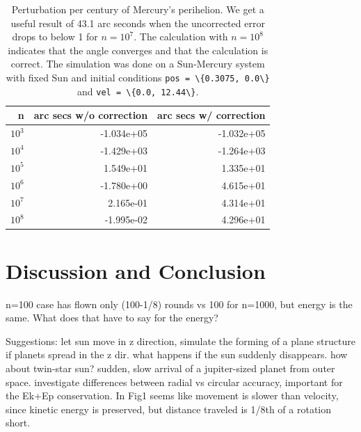 \documentclass[]{article}
\begin{document}
\begin{table}[!ht]
	\caption{Perturbation per century of Mercury's perihelion. We get a useful result of 43.1 arc seconds when the uncorrected error drops to below 1 for $n=10^7$. The calculation with $n=10^8$ indicates that the angle converges and that the calculation is correct. The simulation was done on a Sun-Mercury system with fixed Sun and initial conditions \lstinline|pos = \{0.3075, 0.0\}| and \lstinline|vel = \{0.0, 12.44\}|.}
	\label{tab:perihelion}
	\begin{center}
		\begin{tabular}{rrr}
			\toprule
			n &         arc secs w/o correction &          arc secs w/ correction \\
			\midrule
			$10^3$ & -1.034e+05 & -1.032e+05 \\
			$10^4$ & -1.429e+03 & -1.264e+03 \\
			$10^5$ &  1.549e+01 &  1.335e+01 \\
			$10^6$ & -1.780e+00 &  4.615e+01 \\
			$10^7$ &  2.165e-01 &  4.314e+01 \\
			$10^8$ & -1.995e-02 &  4.296e+01 \\
			\bottomrule
		\end{tabular}
	\end{center}
\end{table}



\section{Discussion and Conclusion} \label{conclusion}

n=100 case has flown only (100-1/8) rounds vs 100 for n=1000, but energy is the same. What does that have to say for the energy?

Suggestions: let sun move in z direction, simulate the forming of a plane structure if planets spread in the z dir. what happens if the sun suddenly disappears. how about twin-star sun? sudden, slow arrival of a jupiter-sized planet from outer space. investigate differences between radial vs circular accuracy, important for the Ek+Ep conservation. In Fig1 seems like movement is slower than velocity, since kinetic energy is preserved, but distance traveled is 1/8th of a rotation short.

\clearpage


\end{document}
